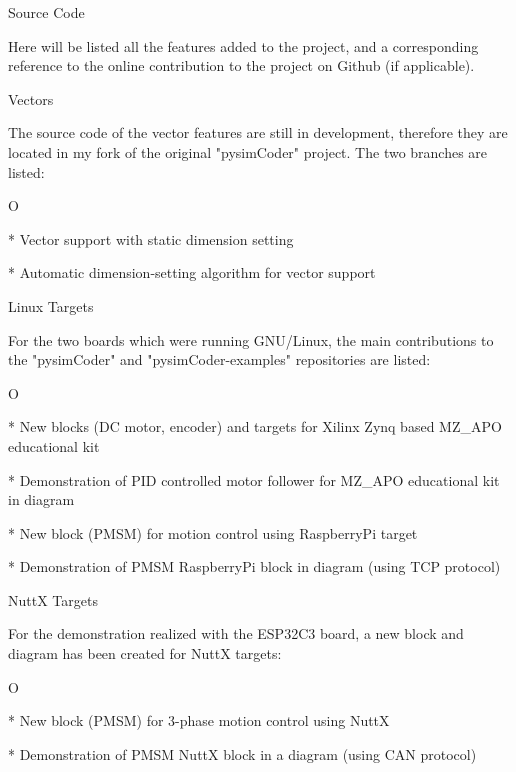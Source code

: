\app Source Code

\qquad Here will be listed all the features added to the project, and a corresponding
reference to the online contribution to the project on Github (if applicable).



\sec Vectors

\qquad The source code of the vector features are still in development, therefore they
are located in my fork of the original "pysimCoder" project. The two branches are listed:

\begitems
\style O

* Vector support with static dimension setting 

* Automatic dimension-setting algorithm for vector support 

\enditems



\sec Linux Targets

\qquad For the two boards which were running GNU/Linux, the main contributions
to the "pysimCoder" and "pysimCoder-examples" repositories are listed:

\begitems
\style O

* New blocks (DC motor, encoder) and targets  for Xilinx Zynq based MZ_APO educational kit

* Demonstration of PID controlled motor follower for MZ_APO educational kit in diagram

* New block (PMSM) for motion control using RaspberryPi target

* Demonstration of PMSM RaspberryPi block in diagram (using TCP protocol)

\enditems



\sec NuttX Targets

\qquad For the demonstration realized with the ESP32C3 board, a new block and diagram has been
created for NuttX targets:

\begitems
\style O

* New block (PMSM) for 3-phase motion control using NuttX

* Demonstration of PMSM NuttX block in a diagram (using CAN protocol)

\enditems
